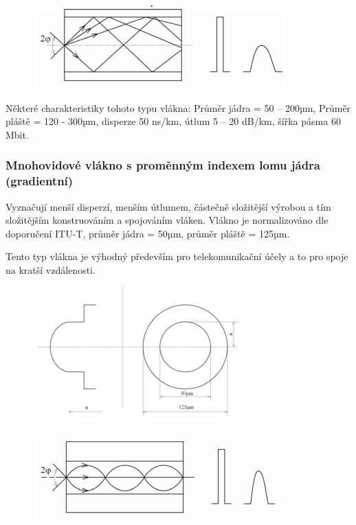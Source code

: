 \begin{figure}[!ht]
\begin{center}
    \includegraphics[scale=1]{obrazky/sirmnoh1.png}
  \end{center}
\end{figure}

Některé charakteristiky tohoto typu vlákna: Průměr jádra = 50 – 200µm, Průměr pláště = 120 - 300µm, disperze 50 ns/km, útlum 5 – 20 dB/km, šířka pásma 60 Mbit. 

\subsubsection{Mnohovidové vlákno s proměnným indexem lomu jádra (gradientní)}
Vyznačují menší disperzí, menším útlumem, částečně složitější výrobou a tím složitějším konstruováním a spojováním vláken. Vlákno je normalizováno dle doporučení ITU-T, průměr jádra = 50µm, průměr pláště = 125µm.

Tento typ vlákna je výhodný především pro telekomunikační účely a to pro spoje na kratší vzdálenosti. 

\begin{figure}[!ht]
\begin{center}
    \includegraphics[scale=1]{obrazky/mnohavid2.png}
  \end{center}
\end{figure}

\begin{figure}[!ht]
\begin{center}
    \includegraphics[scale=1]{obrazky/sirmnoh2.png}
  \end{center}
\end{figure}


